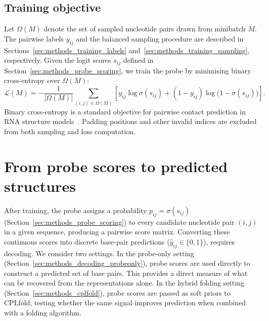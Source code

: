 \documentclass[logo,bsc,singlespacing,parskip]{infthesis}
\begin{document}
\subsection{Training objective}
\label{sec:methods_training_loss}
Let $\Omega(M)$ denote the set of sampled nucleotide pairs drawn from minibatch $M$.
The pairwise labels $y_{ij}$ and the balanced sampling procedure are described in
Sections~\ref{sec:methods_training_labels} and~\ref{sec:methods_training_sampling},
respectively. Given the logit scores $s_{ij}$ defined in
Section~\ref{sec:methods_probe_scoring}, we train the probe by minimising binary
cross-entropy over $\Omega(M)$:
\begin{equation}
\mathcal{L}(M)=
-\frac{1}{|\Omega(M)|}
\sum_{(i,j)\in\Omega(M)}
\left[
y_{ij}\log \sigma(s_{ij}) + (1-y_{ij})\log\!\big(1-\sigma(s_{ij})\big)
\right].
\end{equation}
Binary cross-entropy is a standard objective for pairwise contact
prediction in RNA structure models~\citep{fu2022ufold,singh2019rna}.
Padding positions and other invalid indices are excluded from both
sampling and loss computation.

\section{From probe scores to predicted structures}
\label{sec:methods_decoding}
After training, the probe assigns a probability $p_{ij} = \sigma(s_{ij})$ (Section~\ref{sec:methods_probe_scoring}) to every candidate nucleotide pair $(i,j)$ in a given sequence, producing a pairwise score matrix.
Converting these continuous scores into
discrete base-pair predictions ($\hat{y}_{ij}\in\{0,1\}$), requires decoding. We consider
two settings. In the probe-only setting (Section~\ref{sec:methods_decoding_probeonly}), probe scores are used directly to construct a predicted set of base pairs. This provides a direct measure of what can be recovered from the representations alone. In the hybrid folding setting
(Section~\ref{sec:methods_cplfold}), probe scores are passed as soft
priors to CPLfold, testing whether the same signal improves prediction
when combined with a folding algorithm.
\end{document}
